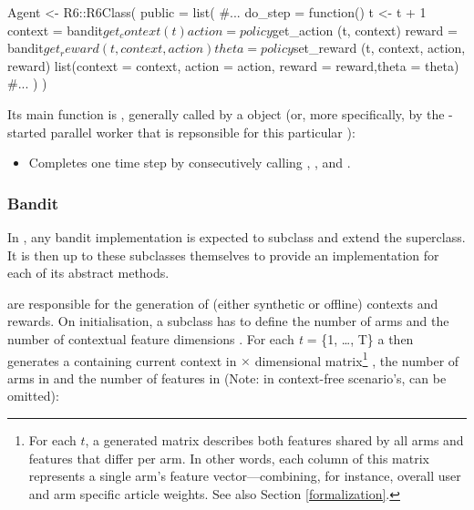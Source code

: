 \documentclass{jss}
\begin{document}
\begin{Code}
Agent <- R6::R6Class(
  public = list(
    #...
    do_step = function() {
      t <- t + 1
      context = bandit$get_context(t)
      action  = policy$get_action (t, context)
      reward  = bandit$get_reward (t, context, action)
      theta   = policy$set_reward (t, context, action, reward)
      list(context = context, action = action, reward = reward,theta = theta)
    }
    #...
  )
)
\end{Code}

Its main function is , generally called by a  object (or, more specifically, by the -started parallel worker that is repsonsible for this particular ):

\begin{itemize}
   \item{}{
      Completes one time step  by consecutively calling
      , ,  and .
    }
\end{itemize}

\subsubsection{Bandit}

In , any bandit implementation is expected to subclass and extend the  superclass. It is then up to these subclasses themselves to provide an implementation for each of its abstract methods.

 are responsible for the generation of (either synthetic or offline) contexts and rewards. On initialisation, a  subclass has to define the number of arms  and the number of contextual feature dimensions . For each \emph{t} = \{1, \ldots, T\} a  then generates a  containing current context in  $\times$  dimensional matrix\footnote{For each $t$, a  generated matrix describes both features shared by all arms and features that differ per arm. In other words, each column of this matrix represents a single arm's feature vector---combining, for instance, overall user and arm specific article weights. See also Section \ref{formalization}.} , the number of arms in  and the number of features in  (Note: in context-free scenario's,  can be omitted):
\end{document}
